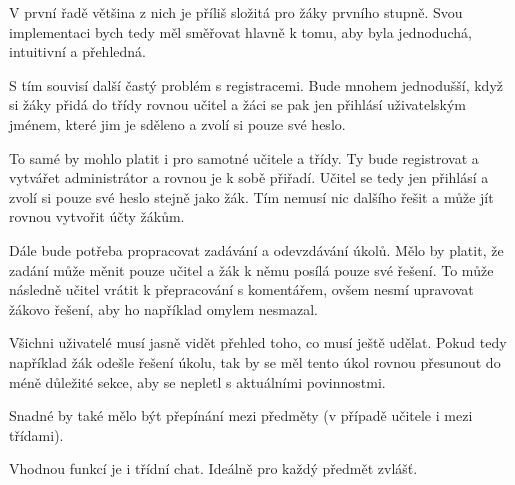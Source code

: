 V první řadě většina z nich je příliš složitá pro žáky prvního stupně. Svou implementaci bych tedy měl směřovat hlavně k tomu, aby byla jednoduchá, intuitivní a přehledná.

S tím souvisí další častý problém s registracemi. Bude mnohem jednodušší, když si žáky přidá do třídy rovnou učitel a žáci se pak jen přihlásí uživatelským jménem, které jim je sděleno a zvolí si pouze své heslo.

To samé by mohlo platit i pro samotné učitele a třídy. Ty bude registrovat a vytvářet administrátor a rovnou je k sobě přiřadí. Učitel se tedy jen přihlásí a zvolí si pouze své heslo stejně jako žák. Tím nemusí nic dalšího řešit a může jít rovnou vytvořit účty žákům.

Dále bude potřeba propracovat zadávání a odevzdávání úkolů. Mělo by platit, že zadání může měnit pouze učitel a žák k němu posílá pouze své řešení. To může následně učitel vrátit k přepracování s komentářem, ovšem nesmí upravovat žákovo řešení, aby ho například omylem nesmazal.

Všichni uživatelé musí jasně vidět přehled toho, co musí ještě udělat. Pokud tedy například žák odešle řešení úkolu, tak by se měl tento úkol rovnou přesunout do méně důležité sekce, aby se nepletl s aktuálními povinnostmi.

Snadné by také mělo být přepínání mezi předměty (v případě učitele i mezi třídami).

Vhodnou funkcí je i třídní chat. Ideálně pro každý předmět zvlášť.